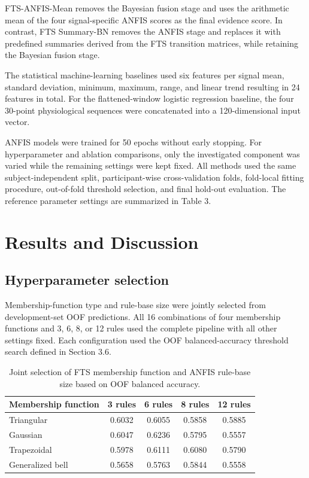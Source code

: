 \documentclass[runningheads]{llncs}
\begin{document}
FTS-ANFIS-Mean removes the Bayesian fusion stage and uses the arithmetic mean of the four signal-specific ANFIS scores as the final evidence score. In contrast, FTS Summary-BN removes the ANFIS stage and replaces it with predefined summaries derived from the FTS transition matrices, while retaining the Bayesian fusion stage.

The statistical machine-learning baselines used six features per signal mean, standard deviation, minimum, maximum, range, and linear trend resulting in 24 features in total. For the flattened-window logistic regression baseline, the four 30-point physiological sequences were concatenated into a 120-dimensional input vector.

ANFIS models were trained for 50 epochs without early stopping. For hyperparameter and ablation comparisons, only the investigated component was varied while the remaining settings were kept fixed. All methods used the same subject-independent split, participant-wise cross-validation folds, fold-local fitting procedure, out-of-fold threshold selection, and final hold-out evaluation. The reference parameter settings are summarized in Table 3.

\section{Results and Discussion}

\subsection{Hyperparameter selection}

Membership-function type and rule-base size were jointly selected from development-set OOF predictions. All 16 combinations of four membership functions and 3, 6, 8, or 12 rules used the complete pipeline with all other settings fixed. Each configuration used the OOF balanced-accuracy threshold search defined in Section 3.6.

\begin{table}[t]
\centering
\caption{Joint selection of FTS membership function and ANFIS rule-base size based on OOF balanced accuracy.}\label{tab:4}
\small
\begin{tabular}{lcccc}
\hline
Membership function & 3 rules & 6 rules & 8 rules & 12 rules \\
\hline
Triangular & 0.6032 & 0.6055 & 0.5858 & 0.5885 \\
Gaussian & 0.6047 & 0.6236 & 0.5795 & 0.5557 \\
Trapezoidal & 0.5978 & 0.6111 & 0.6080 & 0.5790 \\
Generalized bell & 0.5658 & 0.5763 & 0.5844 & 0.5558 \\
\hline
\end{tabular}
\end{table}
\end{document}

